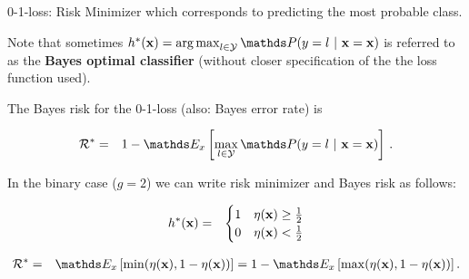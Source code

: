 \documentclass[11pt,compress,t,notes=noshow, xcolor=table]{beamer}
\begin{document}
\begin{vbframe}{0-1-loss: Risk Minimizer}
which corresponds to predicting the most probable class. 

\vspace*{0.2cm} 

Note that sometimes $\hxbayes = \argmax_{l \in \Yspace} \P(y = l~|~ \xv = \xv)$ is referred to as the \textbf{Bayes optimal classifier} (without closer specification of the the loss function used). 

\lz 

The Bayes risk for the 0-1-loss (also: Bayes error rate) is 

\begin{eqnarray*}  
  \riskbayes &=& 1 - \E_x \left[\max_{l \in \Yspace} \P(y = l~|~ \xv = \xv)\right]\,.
\end{eqnarray*}

\lz 

In the binary case ($g = 2$) we can write risk minimizer and Bayes risk as follows:  

\begin{eqnarray*}
  h^{\ast}(\mathbf{x}) &=& \begin{cases} 1 & \eta(\mathbf{x}) \ge \frac{1}{2} \\ 0 & \eta(\mathbf{x}) < \frac{1}{2}\end{cases} \\
\end{eqnarray*}

\vspace*{-0.7cm}

\begin{eqnarray*}
  \riskbayes &=& \E_x\left[\min(\eta(\xv), 1 - \eta(\xv))\right] = 1 - \E_x\left[\max(\eta(\xv), 1 - \eta(\xv))\right] . 
\end{eqnarray*}











\end{vbframe}
\end{document}
